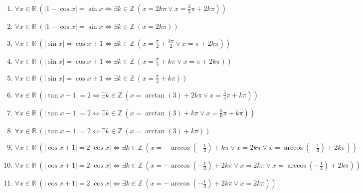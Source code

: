 \documentclass[11pt,a4paper]{article}
\begin{document}
\begin{enumerate}
\item $\displaystyle \forall x \in \mathbb{R}\ \left( \left|1 - \cos x\right| = \sin x \iff \exists k \in \mathbb{Z}\ \left( x = 2k\pi \lor x = \frac{2}{3}\pi + 2k\pi \right) \right)$
\item $\displaystyle \forall x \in \mathbb{R}\ \left( \left|1 - \cos x\right| = \sin x \iff \exists k \in \mathbb{Z}\ \left( x = 2k\pi \right) \right)$
\item $\displaystyle \forall x \in \mathbb{R}\ \left( \left|\sin x\right| = \cos x + 1 \iff \exists k \in \mathbb{Z}\ \left( x = \frac{\pi}{2} + \frac{k\pi}{2} \lor x = \pi + 2k\pi \right) \right)$
\item $\displaystyle \forall x \in \mathbb{R}\ \left( \left|\sin x\right| = \cos x + 1 \iff \exists k \in \mathbb{Z}\ \left( x = \frac{\pi}{3} + k\pi \lor x = \pi + 2k\pi \right) \right)$
\item $\displaystyle \forall x \in \mathbb{R}\ \left( \left|\sin x\right| = \cos x + 1 \iff \exists k \in \mathbb{Z}\ \left( x = \frac{\pi}{2} + k\pi \right) \right)$
\item $\displaystyle \forall x \in \mathbb{R}\ \left( \left|\tan x - 1\right| = 2 \iff \exists k \in \mathbb{Z}\ \left( x = \arctan\left(3\right) + 2k\pi \lor x = \frac{3}{4}\pi + k\pi \right) \right)$
\item $\displaystyle \forall x \in \mathbb{R}\ \left( \left|\tan x - 1\right| = 2 \iff \exists k \in \mathbb{Z}\ \left( x = \arctan\left(3\right) + k\pi \lor x = \frac{5}{6}\pi + k\pi \right) \right)$
\item $\displaystyle \forall x \in \mathbb{R}\ \left( \left|\tan x - 1\right| = 2 \iff \exists k \in \mathbb{Z}\ \left( x = \arctan\left(3\right) + k\pi \right) \right)$
\item $\displaystyle \forall x \in \mathbb{R}\ \left( \left|\cos x + 1\right| = 2\left|\cos x\right| \iff \exists k \in \mathbb{Z}\ \left( x = -\arccos\left(-\frac{1}{3}\right) + k\pi \lor x = 2k\pi \lor x = \arccos\left(-\frac{1}{3}\right) + 2k\pi \right) \right)$
\item $\displaystyle \forall x \in \mathbb{R}\ \left( \left|\cos x + 1\right| = 2\left|\cos x\right| \iff \exists k \in \mathbb{Z}\ \left( x = -\arccos\left(-\frac{1}{3}\right) + 2k\pi \lor x = 2k\pi \lor x = \arccos\left(-\frac{1}{4}\right) + 2k\pi \right) \right)$
\item $\displaystyle \forall x \in \mathbb{R}\ \left( \left|\cos x + 1\right| = 2\left|\cos x\right| \iff \exists k \in \mathbb{Z}\ \left( x = -\arccos\left(-\frac{1}{3}\right) + 2k\pi \lor x = 2k\pi \right) \right)$

\end{enumerate}
\end{document}
